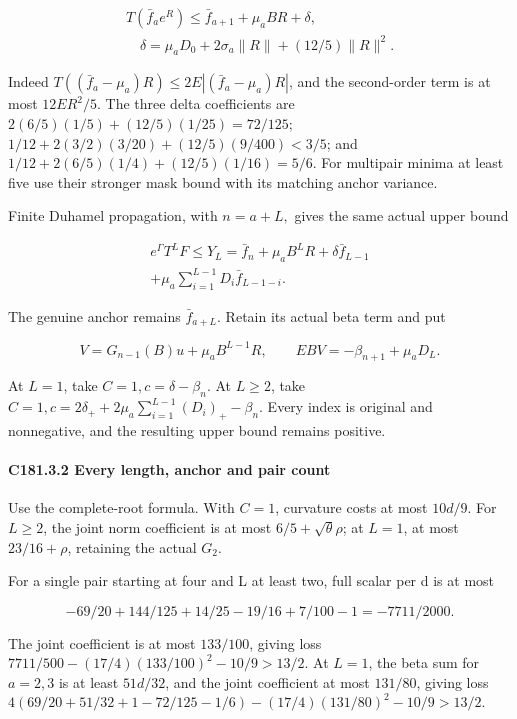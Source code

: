 \[
\begin{gathered}
T(\bar f_ae^R)\le \bar f_{a+1}+\mu_a BR+\delta,\\
\quad\delta=\mu_a D_0+2\sigma_a\|R\|+(12/5)\|R\|^2.
\end{gathered}\tag{C181.T190.16}
\]

Indeed \(T((\bar f_a-\mu_a)R)\le2E| (\bar f_a-\mu_a)R|\), and the second-order term is at most \(12ER^2/5\). The three delta coefficients are \(2(6/5)(1/5)+(12/5)(1/25)=72/125\); \(1/12+2(3/2)(3/20)+(12/5)(9/400)<3/5\); and \(1/12+2(6/5)(1/4)+(12/5)(1/16)=5/6\). For multipair minima at least five use their stronger mask bound with its matching anchor variance.

Finite Duhamel propagation, with \(n=a+L,\allowbreak \) gives the same actual upper bound

\[
\begin{gathered}
e^\Gamma T^LF\le Y_L=\bar f_n+\mu_aB^LR+\delta \bar f_{L-1}\\
+\mu_a\sum_{i=1}^{L-1}D_i \bar f_{L-1-i}.
\end{gathered}\tag{C181.T190.17}
\]

The genuine anchor remains \(\bar f_{a+L}\). Retain its actual beta term and put

\[
V=G_{n-1}(B)u+\mu_aB^{L-1}R,\qquad EBV=-\beta_{n+1}+\mu_aD_L.
\]

At \(L=1\), take \(C=1,\allowbreak \allowbreak  c=\delta-\beta_n\). At \(L\ge2\), take \(C=1,\allowbreak \allowbreak  c=2\delta_++2\mu_a\sum_{i=1}^{L-1}(D_i)_+-\beta_n\). Every index is original and nonnegative, and the resulting upper bound remains positive.

\paragraph{C181.3.2 Every length, anchor and pair count}

Use the complete-root formula. With \(C=1\), curvature costs at most \(10d/9\). For \(L\ge2\), the joint norm coefficient is at most \(6/5+\sqrt\theta\rho\); at \(L=1\), at most \(23/16+\rho\), retaining the actual \(G_2\).

For a single pair starting at four and L at least two, full scalar per d is at most

\[
-69/20+144/125+14/25-19/16+7/100-1=-7711/2000.
\]

The joint coefficient is at most \(133/100\), giving loss \(7711/500-(17/4)(133/100)^2-10/9>13/2\). At \(L=1\), the beta sum for \(a=2,\allowbreak \allowbreak  3\) is at least \(51d/32\), and the joint coefficient at most \(131/80\), giving loss \(4(69/20+51/32+1-72/125-1/6)-(17/4)(131/80)^2-10/9>13/2\).

